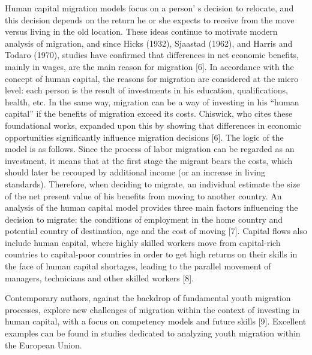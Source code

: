 \begin{multicols}{2}
Human capital migration models focus on a person' s
decision to relocate, and this decision depends on the return he or she
expects to receive from the move versus living in the old location.
These ideas continue to motivate modern analysis of migration, and since
Hicks (1932), Sjaastad (1962), and Harris and Todaro (1970), studies
have confirmed that differences in net economic benefits, mainly in
wages, are the main reason for migration {[}6{]}. In accordance with the
concept of human capital, the reasons for migration are considered at
the micro level: each person is the result of investments in his
education, qualifications, health, etc. In the same way, migration can
be a way of investing in his ``human capital'' if the benefits of
migration exceed its costs. Chiswick, who cites these foundational
works, expanded upon this by showing that differences in economic
opportunities significantly influence migration decisions {[}6{]}. The
logic of the model is as follows. Since the process of labor migration
can be regarded as an investment, it means that at the first stage the
migrant bears the costs, which should later be recouped by additional
income (or an increase in living standards). Therefore, when deciding to
migrate, an individual estimate the size of the net present value of his
benefits from moving to another country. An analysis of the human
capital model provides three main factors influencing the decision to
migrate: the conditions of employment in the home country and potential
country of destination, age and the cost of moving {[}7{]}. Capital
flows also include human capital, where highly skilled workers move from
capital-rich countries to capital-poor countries in order to get high
returns on their skills in the face of human capital shortages, leading
to the parallel movement of managers, technicians and other skilled
workers {[}8{]}.

Contemporary authors, against the backdrop of fundamental youth
migration processes, explore new challenges of migration within the
context of investing in human capital, with a focus on competency models
and future skills {[}9{]}. Excellent examples can be found in studies
dedicated to analyzing youth migration within the European Union.


\end{multicols}
